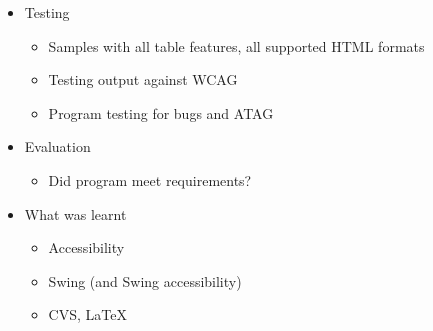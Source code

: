 \documentclass[landscape,20pt]{foils}
\begin{document}


\begin{itemize}

\item Testing

\begin{itemize}

\item Samples with all table features, all supported HTML formats

\item Testing output against WCAG

\item Program testing for bugs and ATAG

\end{itemize}

\item Evaluation

\begin{itemize}

\item Did program meet requirements?

\end{itemize}

\item What was learnt

\begin{itemize}

\item Accessibility

\item Swing (and Swing accessibility)

\item CVS, \LaTeX

\end{itemize}

\end{itemize}

\end{document}
